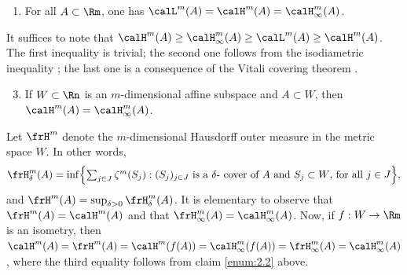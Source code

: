 \begin{Empty}
{\begin{enumerate}
\item\label{enum:2.2} For all $A \subset \Rm$, one has $\calL^m(A) = \calH^m(A) = \calH^m_\infty(A)$.
\end{enumerate}
}
\par
It suffices to note that $\calH^m(A) \geq \calH^m_\infty(A) \geq \calL^m(A) \geq \calH^m(A)$.
The first inequality is trivial; the second one follows from the isodiametric inequality \cite[2.10.33]{GMT}; the last one is a consequence of the Vitali covering theorem \cite[Chap.\,2, \S 2, Th.\,2]{EVANS.GARIEPY}.
\par
{\it
\begin{enumerate}\setcounter{enumi}{2}
\item\label{enum:2.3} If $W \subset \Rn$ is an $m$-dimensional affine subspace and $A \subset W$, then $\calH^m(A) = \calH^m_\infty(A)$.
\end{enumerate}
}
\par
Let $\frH^m$ denote the $m$-dimensional Hausdorff outer measure in the metric space $W$.
In other words,
\begin{equation*}\textstyle
\frH^m_\delta(A) = \inf \Bigl\{ \sum_{j \in J} \zeta^m(S_j): (S_j)_{j \in J} \text{ is a $\delta$- cover of $A$ and $S_j \subset W$, for all $j \in J$}\Bigr\},
\end{equation*}
and $\frH^m(A) = \sup_{\delta > 0} \frH^m_\delta(A)$.
It is elementary to observe that $\frH^m(A) = \calH^m(A)$ and that $\frH^m_\infty(A) = \calH^m_\infty(A)$.
Now, if $f: W \to \Rm$ is an isometry, then $\calH^m(A) = \frH^m(A) = \calH^m(f(A)) = \calH^m_\infty(f(A)) = \frH^m_\infty(A) = \calH^m_\infty(A)$, where the third equality follows from claim \eqref{enum:2.2} above.
\end{Empty}

